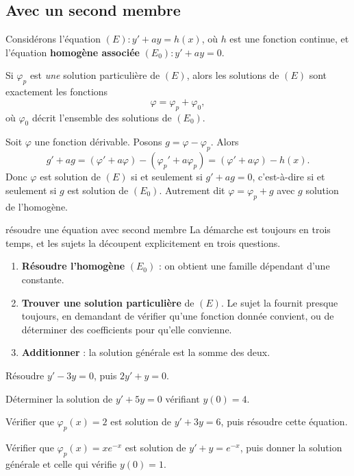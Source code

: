 \subsection{Avec un second membre}

\begin{theoreme}
Considérons l'équation $(E) : y' + ay = h(x)$, où $h$ est une fonction
continue, et l'équation \textbf{homogène associée} $(E_{0}) : y' + ay = 0$.

Si $\varphi_{p}$ est \emph{une} solution particulière de $(E)$, alors les
solutions de $(E)$ sont exactement les fonctions
\[
  \varphi = \varphi_{p} + \varphi_{0},
\]
où $\varphi_{0}$ décrit l'ensemble des solutions de $(E_{0})$.
\end{theoreme}

\begin{demonstration}
Soit $\varphi$ une fonction dérivable. Posons $g = \varphi - \varphi_{p}$.
Alors
\[
  g' + ag = (\varphi'+a\varphi) - (\varphi_{p}'+a\varphi_{p})
          = (\varphi'+a\varphi) - h(x).
\]
Donc $\varphi$ est solution de $(E)$ si et seulement si $g'+ag = 0$,
c'est-à-dire si et seulement si $g$ est solution de $(E_{0})$. Autrement dit
$\varphi = \varphi_{p} + g$ avec $g$ solution de l'homogène.
\end{demonstration}

\begin{methode}{résoudre une équation avec second membre}
La démarche est toujours en trois temps, et les sujets la découpent
explicitement en trois questions.

\begin{enumerate}[label=\textbf{\arabic*.}, leftmargin=*, itemsep=0.28em]
  \item \textbf{Résoudre l'homogène} $(E_{0})$ : on obtient une famille
        dépendant d'une constante.
  \item \textbf{Trouver une solution particulière} de $(E)$. Le sujet la
        fournit presque toujours, en demandant de vérifier qu'une fonction
        donnée convient, ou de déterminer des coefficients pour qu'elle
        convienne.
  \item \textbf{Additionner} : la solution générale est la somme des deux.
\end{enumerate}
\end{methode}

\begin{entrainement}
\exo[\niveau{1}] Résoudre $y' - 3y = 0$, puis $2y' + y = 0$.

\exo[\niveau{1}] Déterminer la solution de $y' + 5y = 0$ vérifiant $y(0) = 4$.

\exo[\niveau{2}] Vérifier que $\varphi_{p}(x) = 2$ est solution de
$y' + 3y = 6$, puis résoudre cette équation.

\exo[\niveau{3}] Vérifier que $\varphi_{p}(x) = xe^{-x}$ est solution de
$y' + y = e^{-x}$, puis donner la solution générale et celle qui vérifie
$y(0) = 1$.
\end{entrainement}

